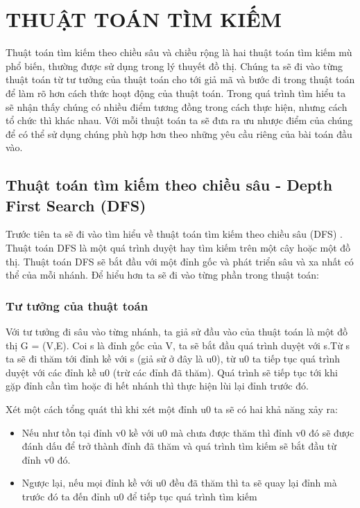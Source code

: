 
\chapter{THUẬT TOÁN TÌM KIẾM} %

\label{Chapter2} %

Thuật toán tìm kiếm theo chiều sâu và chiều rộng là hai thuật toán tìm kiếm mù
phổ biến, thường được sử dụng trong lý thuyết đồ thị. Chúng ta sẽ đi vào từng
thuật toán từ tư tưởng của thuật toán cho tới giả mã và bước đi trong thuật toán để
làm rõ hơn cách thức hoạt động của thuật toán. Trong quá trình tìm hiểu ta sẽ nhận
thấy chúng có nhiều điểm tương đồng trong cách thực hiện, nhưng cách tổ chức thì
khác nhau. Với mỗi thuật toán ta sẽ đưa ra ưu nhược điểm của chúng để có thể sử
dụng chúng phù hợp hơn theo những yêu cầu riêng của bài toán đầu vào.

\section{Thuật toán tìm kiếm theo chiều sâu - Depth First Search (DFS)} 
Trước tiên ta sẽ đi vào tìm hiểu về thuật toán tìm kiếm theo chiều sâu (DFS) \cite{tl2}.
Thuật toán DFS là một quá trình duyệt hay tìm kiếm trên một cây hoặc một đồ thị.
Thuật toán DFS sẽ bắt đầu với một đỉnh gốc và phát triển sâu và xa nhất có thể của
mỗi nhánh. Để hiểu hơn ta sẽ đi vào từng phần trong thuật toán:

\subsection{Tư tưởng của thuật toán}
Với tư tưởng đi sâu vào từng nhánh, ta giả sử đầu vào của thuật toán là một đồ thị
G = (V,E). Coi s là đỉnh gốc của V, ta sẽ bắt đầu quá trình duyệt với s.Từ s ta sẽ đi
thăm tới đỉnh kề với s (giả sử ở đây là u0), từ u0 ta tiếp tục quá trình duyệt với các
đỉnh kề u0 (trừ các đỉnh đã thăm). Quá trình sẽ tiếp tục tới khi gặp đỉnh cần tìm
hoặc đi hết nhánh thì thực hiện lùi lại đỉnh trước đó.

Xét một cách tổng quát thì khi xét một đỉnh u0 ta sẽ có hai khả năng xảy ra:
\begin{itemize}
	\item Nếu như tồn tại đỉnh v0 kề với u0 mà chưa được thăm thì đỉnh v0 đó sẽ được
	đánh dấu để trở thành đỉnh đã thăm và quá trình tìm kiếm sẽ bắt đầu từ đỉnh v0
	đó.
	\item Ngược lại, nếu mọi đỉnh kề với u0 đều đã thăm thì ta sẽ quay lại đỉnh mà trước
	đó ta đến đỉnh u0 để tiếp tục quá trình tìm kiếm
\end{itemize}


